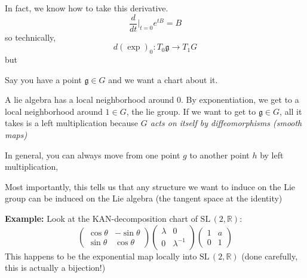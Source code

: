 \documentclass[12pt]{article}
\newcommand{\R}{\mathbb{R}}
\newcommand{\SL}{\text{SL}\,}
\begin{document}
    In fact, we know how to take this derivative. 
    \[\frac{d}{dt}\bigg\vert_{t=0} e^{tB} = B\]
    so technically, 
    \[d(\exp)_0: T_0\mathfrak{g}\to T_1G\] 
    but 

    Say you have a point $\mathfrak{g} \in G$ and we want a chart about it. 
 
    A lie algebra has a local neighborhood around $0$. By exponentiation, we get to a local neighborhood around $1 \in G$, the lie group. If we want to get to $\mathfrak{g} \in G$, all it takes is a left multiplication because \emph{$G$ acts on itself by diffeomorphisms (smooth maps)}
    
    In general, you can always move from one point $g$ to another point $h$ by left multiplication,

    Most importantly, this tells us that any structure we want to induce on the Lie group can be induced on the Lie algebra (the tangent space at the identity)
     
    \textbf{Example:} Look at the KAN-decomposition chart of $\SL(2, \R)$: 
    \[\begin{pmatrix}
        \cos\theta & -\sin \theta\\ 
        \sin \theta & \cos \theta
    \end{pmatrix} \begin{pmatrix}
        \lambda & 0\\ 
        0 & \lambda^{-1}
    \end{pmatrix} \begin{pmatrix}
        1 & a\\ 
        0 & 1
    \end{pmatrix}\] 
    This happens to be the exponential map locally into $\SL(2, \R)$ (done carefully, this is actually a bijection!) 
\end{document}
